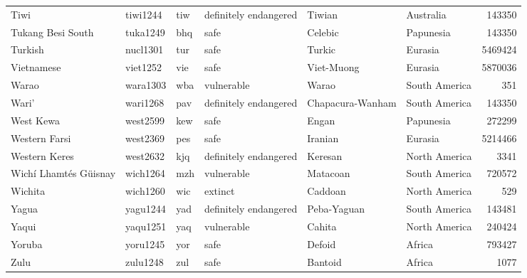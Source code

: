 \begin{longtable}{llllllr}
  Tiwi & tiwi1244 & tiw & definitely endangered & Tiwian & Australia & 143350 \\ 
  Tukang Besi South & tuka1249 & bhq & safe & Celebic & Papunesia & 143350 \\ 
  Turkish & nucl1301 & tur & safe & Turkic & Eurasia & 5469424 \\ 
  Vietnamese & viet1252 & vie & safe & Viet-Muong & Eurasia & 5870036 \\ 
  Warao & wara1303 & wba & vulnerable & Warao & South America & 351 \\ 
  Wari' & wari1268 & pav & definitely endangered & Chapacura-Wanham & South America & 143350 \\ 
  West Kewa & west2599 & kew & safe & Engan & Papunesia & 272299 \\ 
  Western Farsi & west2369 & pes & safe & Iranian & Eurasia & 5214466 \\ 
  Western Keres & west2632 & kjq & definitely endangered & Keresan & North America & 3341 \\ 
  Wichí Lhamtés Güisnay & wich1264 & mzh & vulnerable & Matacoan & South America & 720572 \\ 
  Wichita & wich1260 & wic & extinct & Caddoan & North America & 529 \\ 
  Yagua & yagu1244 & yad & definitely endangered & Peba-Yaguan & South America & 143481 \\ 
  Yaqui & yaqu1251 & yaq & vulnerable & Cahita & North America & 240424 \\ 
  Yoruba & yoru1245 & yor & safe & Defoid & Africa & 793427 \\ 
  Zulu & zulu1248 & zul & safe & Bantoid & Africa & 1077 \\ 
  \hline
\end{longtable}

